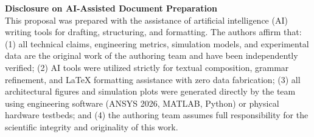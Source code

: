 \documentclass[12pt,a4paper]{article}
\begin{document}
\newpage
\enlargethispage{3\baselineskip}
{\large\bfseries\color{deepSlate} Disclosure on AI-Assisted Document Preparation}\\[0.15cm]
{\small
This proposal was prepared with the assistance of artificial intelligence (AI) writing tools for drafting, structuring, and formatting. The authors affirm that: (1) all technical claims, engineering metrics, simulation models, and experimental data are the original work of the authoring team and have been independently verified; (2) AI tools were utilized strictly for textual composition, grammar refinement, and LaTeX formatting assistance with zero data fabrication; (3) all architectural figures and simulation plots were generated directly by the team using engineering software (ANSYS 2026, MATLAB, Python) or physical hardware testbeds; and (4) the authoring team assumes full responsibility for the scientific integrity and originality of this work.
}
\end{document}
